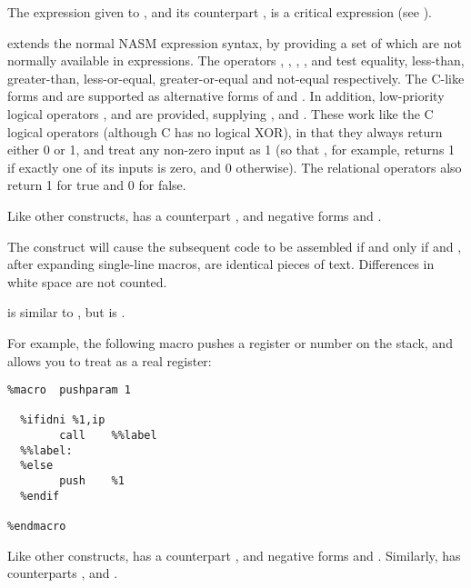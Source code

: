 The expression given to , and its counterpart
, is a critical expression (see ).

 extends the normal NASM expression syntax, by providing a
set of  which are not normally available in
expressions. The operators \codeindex{=}, \codeindex{\textless},
\codeindex{\textgreater}, \codeindex{\textless=}, \codeindex{\textgreater=}
and \codeindex{\textless\textgreater} test equality,
less-than, greater-than, less-or-equal, greater-or-equal and not-equal
respectively. The C-like forms \codeindex{==} and \codeindex{!=} are
supported as alternative forms of \code{=} and \code{\textless\textgreater}.
In addition, low-priority logical operators \codeindex{\&\&},
\codeindex{\^{}\^{}} and \codeindex{||} are provided, supplying
,  and .
These work like the C logical operators (although C has no logical XOR),
in that they always return either 0 or 1, and treat any non-zero input as 1
(so that \code{\^{}\^{}}, for example, returns 1 if exactly one of its inputs
is zero, and 0 otherwise). The relational operators also return 1
for true and 0 for false.

Like other  constructs,  has a counterpart
, and negative forms  and .


The construct  will cause the subsequent code
to be assembled if and only if  and , after
expanding single-line macros, are identical pieces of text.
Differences in white space are not counted.

 is similar to , but is .

For example, the following macro pushes a register or number on the
stack, and allows you to treat  as a real register:

\begin{lstlisting}
%macro  pushparam 1

  %ifidni %1,ip
        call    %%label
  %%label:
  %else
        push    %1
  %endif

%endmacro
\end{lstlisting}

Like other  constructs,  has a counterpart
, and negative forms  and
. Similarly,  has counterparts
,  and .

